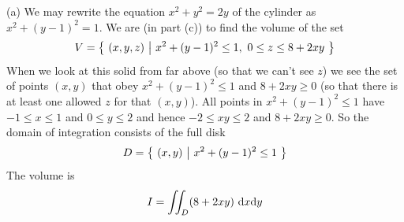 \begin{solution}
(a) We may rewrite the equation $x^2+y^2=2y$ of the cylinder as
$x^2+(y-1)^2=1$. We are (in part (c)) to find the volume of the set
\begin{equation*}
V=\big\{ \ (x,y,z)\ \big|\ x^2+(y-1)^2\le 1,\ 0\le z\le 8+2xy\ \big\}
\end{equation*}
When we look at this solid from far above (so that we can't see $z$) 
we see the set of points $(x,y)$ that 
obey $x^2+(y-1)^2\le 1$ and $8+2xy\ge 0$ (so that there is at least one allowed $z$ for that $(x,y)$). All points in $x^2+(y-1)^2\le 1$
have $-1\le x\le 1$ and $0\le y\le 2$ and hence $-2\le xy\le 2$ and
$8+2xy\ge 0$. So the domain of integration consists of the full disk
\begin{equation*}
D = \big\{ \ (x,y)\ \big|\ x^2+(y-1)^2\le 1\ \big\}
\end{equation*}
The volume is 
\begin{equation*}
I=\dblInt_D (8+2xy)\ \dee{x}\dee{y}
\end{equation*}


\end{solution}
